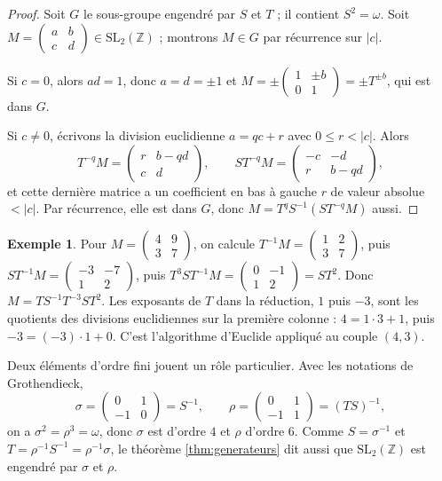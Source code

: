 \documentclass[11pt,a4paper]{article}
\theoremstyle{plain}
\theoremstyle{definition}
\newtheorem{exemple}[theoreme]{Exemple}
\theoremstyle{remark}
\newcommand{\Z}{\mathbb{Z}}
\newcommand{\SL}{\mathrm{SL}}
\begin{document}
\begin{proof}
Soit $G$ le sous-groupe engendré par $S$ et $T$ ; il contient $S^2=\omega$. Soit $M=\begin{pmatrix}a&b\\c&d\end{pmatrix}\in\SL_2(\Z)$ ; montrons $M\in G$ par récurrence sur $|c|$.

Si $c=0$, alors $ad=1$, donc $a=d=\pm1$ et $M=\pm\begin{pmatrix}1&\pm b\\0&1\end{pmatrix}=\pm T^{\pm b}$, qui est dans $G$.

Si $c\neq0$, écrivons la division euclidienne $a=qc+r$ avec $0\leq r<|c|$. Alors
\[
  T^{-q}M=\begin{pmatrix}r&b-qd\\c&d\end{pmatrix},\qquad ST^{-q}M=\begin{pmatrix}-c&-d\\r&b-qd\end{pmatrix},
\]
et cette dernière matrice a un coefficient en bas à gauche $r$ de valeur absolue $<|c|$. Par récurrence, elle est dans $G$, donc $M=T^qS^{-1}(ST^{-q}M)$ aussi.
\end{proof}

\begin{exemple}
Pour $M=\begin{pmatrix}4&9\\3&7\end{pmatrix}$, on calcule $T^{-1}M=\begin{pmatrix}1&2\\3&7\end{pmatrix}$, puis $ST^{-1}M=\begin{pmatrix}-3&-7\\1&2\end{pmatrix}$, puis $T^3ST^{-1}M=\begin{pmatrix}0&-1\\1&2\end{pmatrix}=ST^2$. Donc $M=TS^{-1}T^{-3}ST^2$. Les exposants de $T$ dans la réduction, $1$ puis $-3$, sont les quotients des divisions euclidiennes sur la première colonne : $4=1\cdot3+1$, puis $-3=(-3)\cdot1+0$. C'est l'algorithme d'Euclide appliqué au couple $(4,3)$.
\end{exemple}

Deux éléments d'ordre fini jouent un rôle particulier. Avec les notations de Grothendieck,
\[
  \sigma=\begin{pmatrix}0&1\\-1&0\end{pmatrix}=S^{-1},\qquad \rho=\begin{pmatrix}0&1\\-1&1\end{pmatrix}=(TS)^{-1},
\]
on a $\sigma^2=\rho^3=\omega$, donc $\sigma$ est d'ordre $4$ et $\rho$ d'ordre $6$. Comme $S=\sigma^{-1}$ et $T=\rho^{-1}S^{-1}=\rho^{-1}\sigma$, le théorème \ref{thm:generateurs} dit aussi que $\SL_2(\Z)$ est engendré par $\sigma$ et $\rho$.
\end{document}
